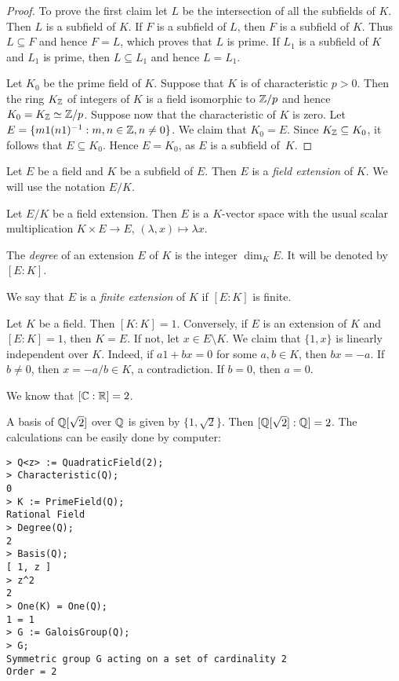 \begin{proof}
	To prove the first claim let $L$ be the intersection
	of all the subfields of $K$. Then $L$ is a subfield of $K$. 
	If $F$ is a subfield of $L$, then $F$ is a subfield
	of $K$. Thus $L\subseteq F$ and hence $F=L$, which proves
	that $L$ is prime. If $L_1$ is a subfield of $K$
	and $L_1$ is prime, then $L\subseteq L_1$ and 
	hence $L=L_1$. 

	Let $K_0$ be the prime field of $K$. Suppose that $K$ is of characteristic
	$p>0$. Then the ring $K_{\mathbb{Z}}$ of integers of $K$ 
	is a field isomorphic to $\mathbb{Z}/p$ and hence $K_0=
	K_{\mathbb{Z}}\simeq \mathbb{Z}/p$. Suppose now that the characteristic of $K$ is zero. Let
	$E=\{m1(n1)^{-1}:m,n\in\mathbb{Z},n\ne 0\}$. We claim that $K_0=E$. Since $K_{\mathbb{Z}}\subseteq
	K_0$, it follows that $E\subseteq K_0$. Hence $E=K_0$, as $E$ is a subfield
	of~$K$.  
\end{proof}

\begin{definition}
	Let $E$ be a field and $K$ be a subfield of $E$. Then 
	$E$ is a \emph{field extension} of $K$. We will use
	the notation $E/K$. 
\end{definition}

Let $E/K$ be a field extension. Then $E$ 
is a $K$-vector space with the usual scalar multiplication
$K\times E\to E$, 
$(\lambda, x)\mapsto \lambda x$.

\begin{definition}
	The \emph{degree} of an extension $E$ of $K$ 
	is the integer $\dim_KE$. It will be denoted by $[E:K]$. 
\end{definition}

We say that $E$ is a \emph{finite extension} of $K$ 
if $[E:K]$ is finite. 

\begin{example}
	Let $K$ be a field. Then $[K:K]=1$. Conversely, 
	if $E$ is an extension of $K$ and $[E:K]=1$, then $K=E$. 
	If not, let $x\in E\setminus K$. We claim that
	$\{1,x\}$ is linearly independent over $K$. Indeed, 
	if $a1+bx=0$ for some $a,b\in K$, then $bx=-a$. If 
	$b\ne 0$, then $x=-a/b\in K$, a contradiction. If $b=0$, then 
	$a=0$. 
\end{example}

We know that $[\mathbb{C}:\mathbb{R}]=2$. 

\begin{example}
	A basis of $\mathbb{Q}[\sqrt{2}]$ over $\mathbb{Q}$ 
	is given by $\{1,\sqrt{2}\}$. Then 
	$[\mathbb{Q}[\sqrt{2}]:\mathbb{Q}]=2$. The calculations 
	can be easily done by computer: 
\begin{lstlisting}
> Q<z> := QuadraticField(2);
> Characteristic(Q);
0
> K := PrimeField(Q);
Rational Field
> Degree(Q);
2
> Basis(Q);
[ 1, z ]
> z^2
2
> One(K) = One(Q);
1 = 1
> G := GaloisGroup(Q);
> G;
Symmetric group G acting on a set of cardinality 2
Order = 2
\end{lstlisting}
\end{example}

